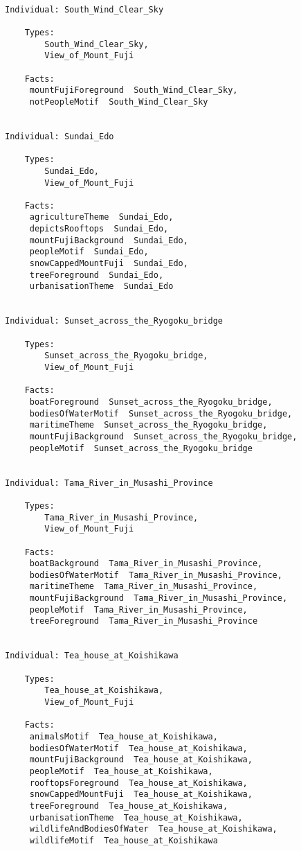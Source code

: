 \documentclass[titlepage,a4paper,12pt,oneside]{book}
\begin{document}
\begin{appendices}
\begin{lstlisting}
    
Individual: South_Wind_Clear_Sky

    Types: 
        South_Wind_Clear_Sky,
        View_of_Mount_Fuji
    
    Facts:  
     mountFujiForeground  South_Wind_Clear_Sky,
     notPeopleMotif  South_Wind_Clear_Sky
    
    
Individual: Sundai_Edo

    Types: 
        Sundai_Edo,
        View_of_Mount_Fuji
    
    Facts:  
     agricultureTheme  Sundai_Edo,
     depictsRooftops  Sundai_Edo,
     mountFujiBackground  Sundai_Edo,
     peopleMotif  Sundai_Edo,
     snowCappedMountFuji  Sundai_Edo,
     treeForeground  Sundai_Edo,
     urbanisationTheme  Sundai_Edo
    
    
Individual: Sunset_across_the_Ryogoku_bridge

    Types: 
        Sunset_across_the_Ryogoku_bridge,
        View_of_Mount_Fuji
    
    Facts:  
     boatForeground  Sunset_across_the_Ryogoku_bridge,
     bodiesOfWaterMotif  Sunset_across_the_Ryogoku_bridge,
     maritimeTheme  Sunset_across_the_Ryogoku_bridge,
     mountFujiBackground  Sunset_across_the_Ryogoku_bridge,
     peopleMotif  Sunset_across_the_Ryogoku_bridge
    
    
Individual: Tama_River_in_Musashi_Province

    Types: 
        Tama_River_in_Musashi_Province,
        View_of_Mount_Fuji
    
    Facts:  
     boatBackground  Tama_River_in_Musashi_Province,
     bodiesOfWaterMotif  Tama_River_in_Musashi_Province,
     maritimeTheme  Tama_River_in_Musashi_Province,
     mountFujiBackground  Tama_River_in_Musashi_Province,
     peopleMotif  Tama_River_in_Musashi_Province,
     treeForeground  Tama_River_in_Musashi_Province
    
    
Individual: Tea_house_at_Koishikawa

    Types: 
        Tea_house_at_Koishikawa,
        View_of_Mount_Fuji
    
    Facts:  
     animalsMotif  Tea_house_at_Koishikawa,
     bodiesOfWaterMotif  Tea_house_at_Koishikawa,
     mountFujiBackground  Tea_house_at_Koishikawa,
     peopleMotif  Tea_house_at_Koishikawa,
     rooftopsForeground  Tea_house_at_Koishikawa,
     snowCappedMountFuji  Tea_house_at_Koishikawa,
     treeForeground  Tea_house_at_Koishikawa,
     urbanisationTheme  Tea_house_at_Koishikawa,
     wildlifeAndBodiesOfWater  Tea_house_at_Koishikawa,
     wildlifeMotif  Tea_house_at_Koishikawa
    

\end{lstlisting}
\end{appendices}
\end{document}
